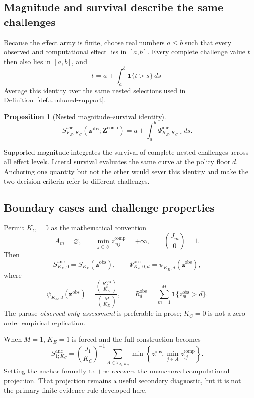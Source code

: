 \documentclass[11pt]{article}
\newcommand{\Sanc}{S^{\mathrm{anc}}}
\newcommand{\Psianc}{\Psi^{\mathrm{anc}}}
\newtheorem{proposition}{Proposition}
\theoremstyle{remark}
\begin{document}
\subsection{Magnitude and survival describe the same challenges}

Because the effect array is finite, choose real numbers $a\leq b$ such that
every observed and computational effect lies in $[a,b]$. Every complete
challenge value $t$ then also lies in $[a,b]$, and
\[
t=a+\int_a^b\mathbf 1\{t>s\}\,ds.
\]
Average this identity over the same nested selections used in
Definition~\ref{def:anchored-support}.

\begin{proposition}[Nested magnitude--survival identity]
\label{prop:survival-identity}
\begin{equation}
\Sanc_{K_E;K_C}
\left(\mathbf z^{\mathrm{obs}};\mathbf Z^{\mathrm{comp}}\right)
=
a+
\int_a^b
\Psianc_{K_E;K_C,s}\,ds.
\label{eq:nested-survival-identity}
\end{equation}
\end{proposition}

Supported magnitude integrates the survival of complete nested challenges
across all effect levels. Literal survival evaluates the same curve at the
policy floor $d$. Anchoring one quantity but not the other would sever this
identity and make the two decision criteria refer to different challenges.

\subsection{Boundary cases and challenge properties}
\label{sec:properties}

Permit $K_C=0$ as the mathematical convention
\[
A_m=\varnothing,
\qquad
\min_{j\in\varnothing}z_{mj}^{\mathrm{comp}}=+\infty,
\qquad
\binom{J_m}{0}=1.
\]
Then
\begin{equation}
\Sanc_{K_E;0}
=S_{K_E}(\mathbf z^{\mathrm{obs}}),
\qquad
\Psianc_{K_E;0,d}
=\psi_{K_E,d}(\mathbf z^{\mathrm{obs}}),
\label{eq:observed-boundary}
\end{equation}
where
\[
\psi_{K_E,d}(\mathbf z^{\mathrm{obs}})
=
\frac{\binom{R_d^{\mathrm{obs}}}{K_E}}
{\binom{M}{K_E}},
\qquad
R_d^{\mathrm{obs}}
=
\sum_{m=1}^M\mathbf 1\{z_m^{\mathrm{obs}}>d\}.
\]
The phrase \emph{observed-only assessment} is preferable in prose;
$K_C=0$ is not a zero-order empirical replication.

When $M=1$, $K_E=1$ is forced and the full construction becomes
\begin{equation}
\Sanc_{1;K_C}
=
\binom{J_1}{K_C}^{-1}
\sum_{A\in\mathcal I_{J_1,K_C}}
\min\left\{z_1^{\mathrm{obs}},
\min_{j\in A}z_{1j}^{\mathrm{comp}}\right\}.
\label{eq:one-evaluation-boundary}
\end{equation}
Setting the anchor formally to $+\infty$ recovers the unanchored computational
projection. That projection remains a useful secondary
diagnostic, but it is not the primary finite-evidence rule developed here.
\end{document}
